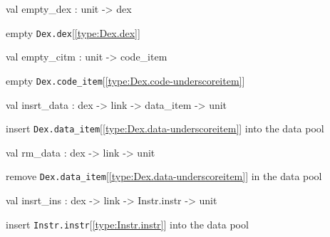 \documentclass[11pt]{article}
\begin{document}
\label{val:Dex.empty-underscoredex}\begin{ocamldoccode}
val empty_dex : unit -> dex
\end{ocamldoccode}
\begin{ocamldocdescription}
empty {\tt{Dex.dex}}[\ref{type:Dex.dex}]


\end{ocamldocdescription}




\label{val:Dex.empty-underscorecitm}\begin{ocamldoccode}
val empty_citm : unit -> code_item
\end{ocamldoccode}
\begin{ocamldocdescription}
empty {\tt{Dex.code\_item}}[\ref{type:Dex.code-underscoreitem}]


\end{ocamldocdescription}




\label{val:Dex.insrt-underscoredata}\begin{ocamldoccode}
val insrt_data : dex -> link -> data_item -> unit
\end{ocamldoccode}
\begin{ocamldocdescription}
insert {\tt{Dex.data\_item}}[\ref{type:Dex.data-underscoreitem}] into the data pool


\end{ocamldocdescription}




\label{val:Dex.rm-underscoredata}\begin{ocamldoccode}
val rm_data : dex -> link -> unit
\end{ocamldoccode}
\begin{ocamldocdescription}
remove {\tt{Dex.data\_item}}[\ref{type:Dex.data-underscoreitem}] in the data pool


\end{ocamldocdescription}




\label{val:Dex.insrt-underscoreins}\begin{ocamldoccode}
val insrt_ins : dex -> link -> Instr.instr -> unit
\end{ocamldoccode}
\begin{ocamldocdescription}
insert {\tt{Instr.instr}}[\ref{type:Instr.instr}] into the data pool


\end{ocamldocdescription}
\end{document}
